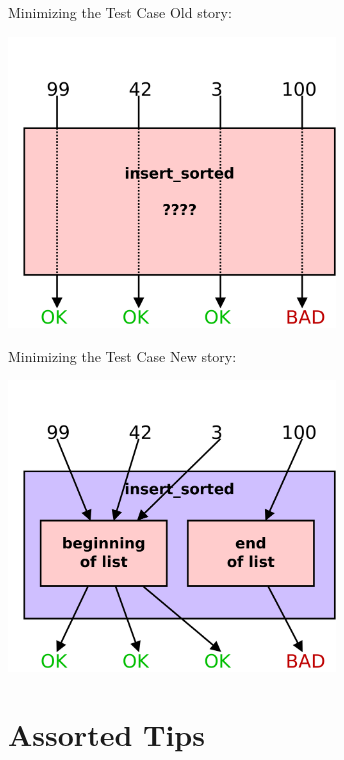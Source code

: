 \documentclass[xcolor=dvipsnames]{beamer}
\begin{document}
\begin{frame}{Minimizing the Test Case}
	Old story:

	\begin{center}
	\includegraphics[width=0.65\textwidth]{space0.png}
	\end{center}
\end{frame}
\begin{frame}{Minimizing the Test Case}
	New story:

	\begin{center}
	\includegraphics[width=0.65\textwidth]{space1.png}
	\end{center}
\end{frame}

\section{Assorted Tips}

\end{document}
